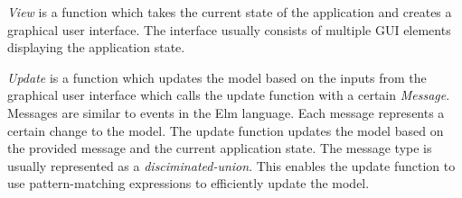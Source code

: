 \emph{View} is a function which takes the current state of the application and creates a
graphical user interface. The interface usually consists of multiple GUI elements displaying the application state.

\emph{Update} is a function which updates the model based on the inputs from the graphical user interface which calls the update function with a certain \emph{Message}.
Messages are similar to events in the Elm language. Each message represents a certain change to the model.
The update function updates the model based on the provided message and the current application state.
The message type is usually represented as a \emph{disciminated-union}.
This enables the update function to use pattern-matching expressions to efficiently update the model.

